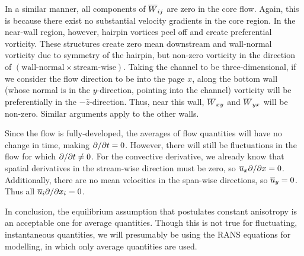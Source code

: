 \documentclass[11pt]{article}
\begin{document}
In a similar manner, all components of $\overline{W}_{ij}$ are zero in the core flow. Again, this is because there exist no substantial velocity gradients in the core region. In the near-wall region, however, hairpin vortices peel off and create preferential vorticity. These structures create zero mean downstream and wall-normal vorticity due to symmetry of the hairpin, but non-zero vorticity in the direction of $(\text{wall-normal} \times \text{stream-wise})$. Taking the channel to be three-dimensional, if we consider the flow direction to be into the page $x$, along the bottom wall (whose normal is in the $y$-direction, pointing into the channel) vorticity will be preferentially in the $-\hat{z}$-direction. Thus, near this wall, $\overline{W}_{xy}$ and $\overline{W}_{yx}$ will be non-zero. Similar arguments apply to the other walls.

Since the flow is fully-developed, the averages of flow quantities will have no change in time, making $\partial  / \partial t=0$. However, there will still be fluctuations in the flow for which $\partial  / \partial t \neq 0$. For the convective derivative, we already know that spatial derivatives in the stream-wise direction must be zero, so $\overline{u}_x \partial  / \partial x=0$. Additionally, there are no mean velocities in the span-wise directions, so $\overline{u}_y=0$. Thus all $\overline{u}_i \partial  / \partial x_i=0$.

In conclusion, the equilibrium assumption that postulates constant anisotropy is an acceptable one for average quantities. Though this is not true for fluctuating, instantaneous quantities, we will presumably be using the RANS equations for modelling, in which only average quantities are used.

\subsection{}



\subsection{}

\subsection{}

\subsection{}
\end{document}
